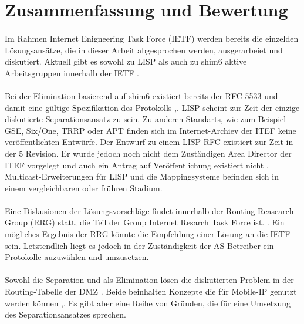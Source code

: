 \section{Zusammenfassung und Bewertung}
\paragraph{}
Im Rahmen Internet Enigneering Task Force (IETF) werden bereits die einzelden Lösungsansätze, die in dieser Arbeit abgesprochen werden, ausgerarbeiet und diskutiert. Aktuell gibt es sowohl zu LISP als auch zu shim6 aktive Arbeitsgruppen innerhalb der IETF \cite{ietf:groups}.

\paragraph{}
Bei der Elimination basierend auf shim6 existiert bereits der RFC 5533 und damit eine gültige Spezifikation des Protokolls \cite{nordmark:2009:RFC5533},\cite{ietf:documents}. LISP scheint zur Zeit der einzige diskutierte Separationsansatz zu sein. Zu anderen Standarts, wie zum Beispiel GSE, Six/One, TRRP oder APT finden sich im Internet-Archiev der ITEF keine veröffentlichten Entwürfe. Der Entwurf zu einem LISP-RFC \cite{farinacci:2009:LISP} existiert zur Zeit in der 5 Revision. Er wurde jedoch noch nicht dem Zuständigen Area Director der ITEF vorgelegt und auch ein Antrag auf Veröffentlichung existiert nicht \cite{ietf:documents}.  Multicast-Erweiterungen für LISP und die Mappingsysteme befinden sich in einem vergleichbaren oder frühren Stadium. 

\paragraph{}
Eine Diskusionen der Lösungsvorschläge findet innerhalb der Routing Reasearch Group (RRG) statt, die Teil der Group Internet Resarch Task Force ist. \cite{irtf:rrg}. Ein mögliches Ergebnis der RRG könnte die Empfehlung einer Lösung an die IETF sein. Letztendlich liegt es jedoch in der Zuständigkeit der AS-Betreiber ein Protokolle auzuwählen und umzusetzen.

\paragraph{}
Sowohl die Separation und als Elimination lösen die diskutierten Problem in der Routing-Tabelle der DMZ \cite{jen:2008:start}. Beide beinhalten Konzepte die für Mobile-IP genutzt werden können \cite{farinacci:2009:LISP},\cite{nordmark:2009:RFC5533}. Es gibt aber eine Reihe von Gründen, die für eine Umsetzung des Separationsansatzes sprechen. 

